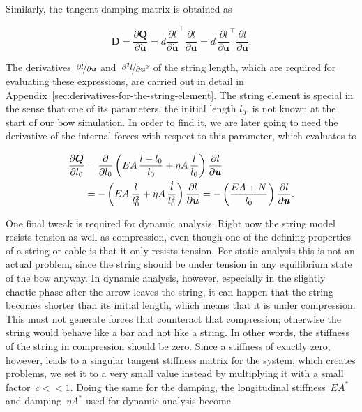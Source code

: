 Similarly, the tangent damping matrix is obtained as

\begin{equation}
\boldsymbol{D} = \frac{\partial\boldsymbol{Q}}{\partial\dot{\boldsymbol{u}}} = d\frac{\partial\dot{l}}{\partial\dot{\boldsymbol{u}}}^\intercal\frac{\partial l}{\partial\boldsymbol{u}} = d\,\frac{\partial l}{\partial\boldsymbol{u}}^\intercal\frac{\partial l}{\partial\boldsymbol{u}}.
\end{equation}

The derivatives~$\nicefrac{\partial l}{\partial\boldsymbol{u}}$ and~$\nicefrac{\partial^2 l}{\partial\boldsymbol{u}^2}$ of the string length, which are required for evaluating these expressions, are carried out in detail in Appendix~\ref{sec:derivatives-for-the-string-element}.
The string element is special in the sense that one of its parameters, the initial length $l_0$, is not known at the start of our bow simulation.
In order to find it, we are later going to need the derivative of the internal forces with respect to this parameter, which evaluates to

\begin{align}
\frac{\partial \boldsymbol{Q}}{\partial l_0} &= \frac{\partial}{\partial l_0}\left(EA\,\frac{l - l_0}{l_0} + \eta A\,\frac{\dot{l}}{l_0} \right)\frac{\partial l}{\partial \boldsymbol{u}} \notag \\
&= -\left(EA\,\frac{l}{l_0^2} + \eta A\,\frac{\dot{l}}{l_0^2}\right)\frac{\partial l}{\partial \boldsymbol{u}} = -\left(\frac{EA + N}{l_0}\right)\frac{\partial l}{\partial \boldsymbol{u}}.
\end{align}

One final tweak is required for dynamic analysis.
Right now the string model resists tension as well as compression, even though one of the defining properties of a string or cable is that it only resists tension.
For static analysis this is not an actual problem, since the string should be under tension in any equilibrium state of the bow anyway.
In dynamic analysis, however, especially in the slightly chaotic phase after the arrow leaves the string, it can happen that the string becomes shorter than its initial length, which means that it is under compression.
This must not generate forces that counteract that compression; otherwise the string would behave like a bar and not like a string.
In other words, the stiffness of the string in compression should be zero.
Since a stiffness of exactly zero, however, leads to a singular tangent stiffness matrix for the system, which creates problems, we set it to a very small value instead by multiplying it with a small factor~$c << 1$.
Doing the same for the damping, the longitudinal stiffness~$EA^*$ and damping~$\eta A^*$ used for dynamic analysis become

